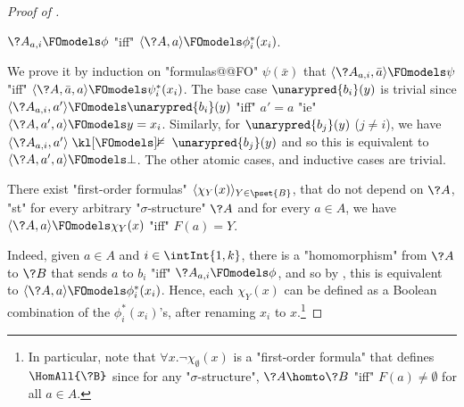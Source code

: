 \begin{proof}[Proof of ]
	\begin{claim}
		\AP\label{claim:finite-duality-uniformly-definable-homomorphisms-new-formulas}
		$\?A_{a,i} \FOmodels \phi$
		"iff" $\langle \?A, a \rangle \FOmodels \phi^*_i(x_i)$.
	\end{claim}
	We prove it by induction on "formulas@@FO" $\psi(\bar x)$
	that $\langle\?A_{a,i}, \bar a \rangle \FOmodels \psi$
		"iff" $\langle \?A, \bar a, a \rangle \FOmodels \psi^*_i(x_i)$.
	The base case $\unarypred{b_i}(y)$ is trivial since
	$\langle \?A_{a,i}, a' \rangle \FOmodels \unarypred{b_i}(y)$ "iff"
	$a' = a$ "ie" $\langle \?A, a', a \rangle \FOmodels y = x_i$.
	Similarly, for $\unarypred{b_j}(y)$ ($j \neq i$), we have
	$\langle \?A_{a,i}, a' \rangle \notFOmodels \unarypred{b_j}(y)$
	and so this is equivalent to $\langle \?A, a', a \rangle \FOmodels \bot$.
	The other atomic cases, and inductive cases are trivial.

	\begin{claim}
		\AP\label{claim:finite-duality-uniformly-definable-homomorphisms-formulas}
		There exist "first-order formulas" $\langle \chi_Y(x)\rangle_{Y\in \pset{B}}$,
		that do not depend on $\?A$, "st" for every arbitrary "$\sigma$-structure" $\?A$
		and for every $a\in A$, we have $\langle \?A,a \rangle \FOmodels \chi_Y(x)$ "iff"
		$F(a) = Y$.
	\end{claim}
	Indeed, given $a\in A$ and $i \in \intInt{1,k}$, there is a "homomorphism" from $\?A$
	to $\?B$ that sends $a$ to $b_i$ "iff" $\?A_{a,i} \FOmodels \phi$, and so by , this is equivalent to
	$\langle \?A,a\rangle \FOmodels \phi^*_i(x_i)$. Hence, each $\chi_Y(x)$ can be defined as
	a Boolean combination of the $\phi^*_i(x_i)$'s, after renaming $x_i$ to $x$.\footnote{In 
	particular, note that $\forall x. \neg \chi_\emptyset(x)$ is a "first-order formula"
	that defines $\HomAll{\?B}$ since for any "$\sigma$-structure", $\?A \homto \?B$
	"iff" $F(a) \neq \emptyset$ for all $a \in A$.}


\end{proof}
